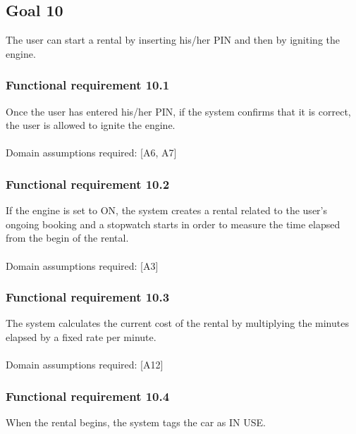 \subsection{Goal 10}
The user can start a rental by inserting his/her PIN and then by igniting the engine.

\setcounter{secnumdepth}{3}
\subsubsection{Functional requirement 10.1}
Once the user has entered his/her PIN, if the system confirms that it is correct, the user is allowed to ignite the engine.\\~\\
\noindent Domain assumptions required: [A6, A7]

\subsubsection{Functional requirement 10.2}
If the engine is set to ON, the system creates a rental related to the user's ongoing booking and a stopwatch starts in order to measure the time elapsed from the begin of the rental.\\~\\
\noindent Domain assumptions required: [A3]

\subsubsection{Functional requirement 10.3}
The system calculates the current cost of the rental by multiplying the minutes elapsed by a fixed rate per minute.\\~\\
\noindent Domain assumptions required: [A12]

\subsubsection{Functional requirement 10.4}
When the rental begins, the system tags the car as IN USE.
